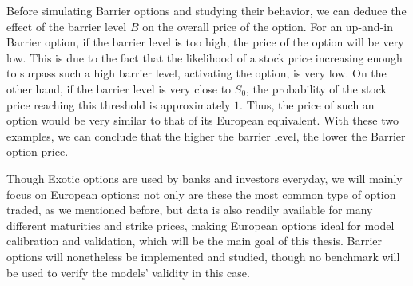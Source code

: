 Before simulating Barrier options and studying their behavior, we can deduce the effect of the barrier level $B$ on the overall price of the option. For an up-and-in Barrier option, if the barrier level is too high, the price of the option will be very low. This is due to the fact that the likelihood of a stock price increasing enough to surpass such a high barrier level, activating the option, is very low. On the other hand, if the barrier level is very close to $S_0$, the probability of the stock price reaching this threshold is approximately $1$. Thus, the price of such an option would be very similar to that of its European equivalent.
With these two examples, we can conclude that the higher the barrier level, the lower the Barrier option price.




Though Exotic options are used by banks and investors everyday, we will mainly focus on European options: not only are these the most common type of option traded, as we mentioned before, but data is also readily available for many different maturities and strike prices, making European options ideal for model calibration and validation, which will be the main goal of this thesis.
Barrier options will nonetheless be implemented and studied, though no benchmark will be used to verify the models' validity in this case.


